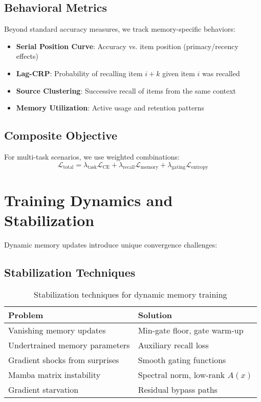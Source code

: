 \documentclass[11pt]{article}
\begin{document}
\subsection{Behavioral Metrics}

Beyond standard accuracy measures, we track memory-specific behaviors:
\begin{itemize}
\item \textbf{Serial Position Curve}: Accuracy vs. item position (primacy/recency effects)
\item \textbf{Lag-CRP}: Probability of recalling item $i+k$ given item $i$ was recalled
\item \textbf{Source Clustering}: Successive recall of items from the same context
\item \textbf{Memory Utilization}: Active usage and retention patterns
\end{itemize}

\subsection{Composite Objective}

For multi-task scenarios, we use weighted combinations:
\begin{equation}
\mathcal{L}_{\text{total}} = \lambda_{\text{task}} \mathcal{L}_{\text{CE}} + \lambda_{\text{recall}} \mathcal{L}_{\text{memory}} + \lambda_{\text{gating}} \mathcal{L}_{\text{entropy}}
\end{equation}

\section{Training Dynamics and Stabilization}

Dynamic memory updates introduce unique convergence challenges:

\subsection{Stabilization Techniques}

\begin{table}[h]
\centering
\begin{tabular}{@{}ll@{}}
\toprule
\textbf{Problem} & \textbf{Solution} \\
\midrule
Vanishing memory updates & Min-gate floor, gate warm-up \\
Undertrained memory parameters & Auxiliary recall loss \\
Gradient shocks from surprises & Smooth gating functions \\
Mamba matrix instability & Spectral norm, low-rank $A(x)$ \\
Gradient starvation & Residual bypass paths \\
\bottomrule
\end{tabular}
\caption{Stabilization techniques for dynamic memory training}
\label{tab:stabilization}
\end{table}
\end{document}
